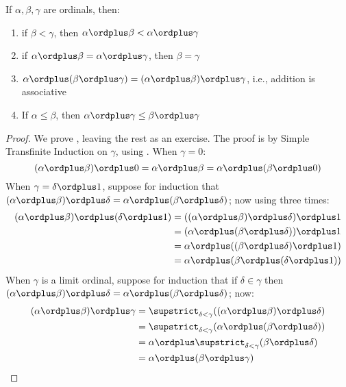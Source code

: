 \documentclass[../../../include/open-logic-section]{subfiles}
\begin{document}
\begin{lem}
If $\alpha, \beta, \gamma$ are ordinals, then:
\begin{enumerate}
	\item{} if $\beta < \gamma$, then $\alpha
	\ordplus  \beta < \alpha \ordplus  \gamma$
	\item{} if $\alpha \ordplus  \beta =
	\alpha\ordplus \gamma$, then $\beta = \gamma$
	\item{}  $\alpha \ordplus  (\beta \ordplus
	\gamma) = (\alpha \ordplus  \beta) \ordplus  \gamma$, i.e.,
	addition is associative
	\item{}  If $\alpha \leq \beta$, then $\alpha
	\ordplus  \gamma \leq \beta \ordplus \gamma$
\end{enumerate}
\end{lem}

\begin{proof}
We prove , leaving the rest as an exercise. The
proof is by Simple Transfinite Induction on $\gamma$, using
. When $\gamma = 0$:
\[
(\alpha \ordplus  \beta) \ordplus  0 = \alpha \ordplus  \beta  = \alpha \ordplus  (\beta \ordplus  0)
\]
When $\gamma = \delta\ordplus 1$, suppose for induction that $(\alpha
\ordplus  \beta) \ordplus  \delta = \alpha \ordplus  (\beta \ordplus
\delta)$; now using  three times:
\begin{align*}
	(\alpha \ordplus  \beta) \ordplus  (\delta \ordplus  1) & = ((\alpha \ordplus  \beta) \ordplus  \delta)\ordplus 1\\
	& = (\alpha \ordplus  (\beta \ordplus  \delta)) \ordplus  1\\
	& = \alpha \ordplus  ((\beta \ordplus  \delta)\ordplus 1)\\
	& = \alpha \ordplus  (\beta \ordplus  (\delta\ordplus 1))
\end{align*}	
When $\gamma$ is a limit ordinal, suppose for induction that if
$\delta \in \gamma$ then $(\alpha \ordplus  \beta) \ordplus  \delta =
\alpha \ordplus  (\beta \ordplus  \delta)$; now:
\begin{align*}
	(\alpha \ordplus  \beta) \ordplus  \gamma & = \supstrict_{\delta < \gamma}((\alpha \ordplus  \beta) \ordplus  \delta) \\
	&= \supstrict_{\delta < \gamma}(\alpha \ordplus  (\beta \ordplus  \delta))\\
	&= \alpha \ordplus  \supstrict_{\delta < \gamma}(\beta \ordplus  \delta)\\
	& = \alpha \ordplus  (\beta \ordplus  \gamma)
\end{align*}
\end{proof}
\end{document}
